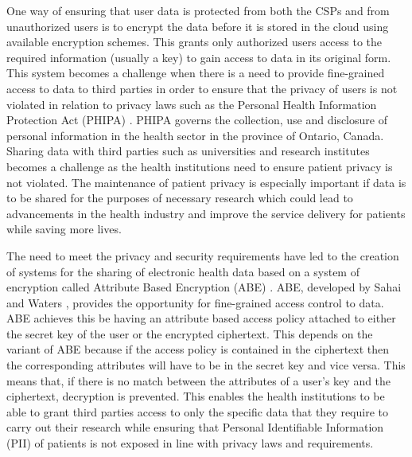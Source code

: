 
One way of ensuring that user data is protected from both the CSPs and from unauthorized users is to encrypt the data before it is stored in the cloud using available encryption schemes. This grants only authorized users access to the required information (usually a key) to gain access to data in its original form. This system becomes a challenge when there is a need to provide fine-grained access to data to third parties in order to ensure that the privacy of users is not violated in relation to privacy laws such as the Personal Health Information Protection Act (PHIPA) \cite{pihipa}. PHIPA governs the collection, use and disclosure of personal information in the health sector in the province of Ontario, Canada. Sharing data with third parties such as universities and research institutes becomes a challenge as the health institutions need to ensure patient privacy is not violated. The maintenance of patient privacy is especially important if data is to be shared for the purposes of necessary research which could lead to advancements in the health industry and improve the service delivery for patients while saving more lives.

The need to meet the privacy and security requirements have led to the creation of systems for the sharing of electronic health data based on a system of encryption called Attribute Based Encryption (ABE) \cite{Ibraimi2010, Narayan2010, Akinyele2010, Barua2011, Alshehri, Hupperich2012, Hsieh2012, Li2013}. ABE, developed by Sahai and Waters \cite{Sahai2005}, provides the opportunity for fine-grained access control to data. ABE achieves this be having an attribute based access policy attached to either the secret key of the user or the encrypted ciphertext. This depends on the variant of ABE because if the access policy is contained in the ciphertext then the corresponding attributes will have to be in the secret key and vice versa. This means that, if there is no match between the attributes of a user's key and the ciphertext, decryption is prevented. This enables the health institutions to be able to grant third parties access to only the specific data that they require to carry out their research while ensuring that Personal Identifiable Information (PII) of patients is not exposed in line with privacy laws and requirements.

